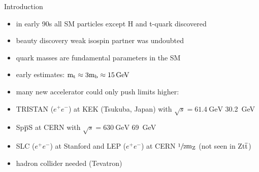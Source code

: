\begin{frame}{Introduction}

	\begin{minipage}[c][.23\textheight]{.8\textwidth}
		\begin{itemize}
			\itemfill
			\item in early 90s all SM particles except H and t-quark discovered
			\item beauty discovery \ra weak isospin partner was undoubted
			\item quark masses are fundamental parameters in the SM
		\end{itemize}
	\end{minipage}
	\begin{minipage}{.18\textwidth}
	\end{minipage}
	
	\begin{itemize}\itemfill
		\item early estimates: $\text{m}_{\text{t}} \approx 3 \text{m}_{\text{b}} \approx \SI{15}{\giga\electronvolt}$
		\item many new accelerator could only push limits higher:
		\item TRISTAN ($e^+e^-$) at KEK (Tsukuba, Japan) with $\sqrt{s} = \SI{61.4}{\giga\electronvolt}$ \ra \SI{30.2}{\giga\electronvolt}
		\item Sp$\overline{\text{p}}$S at CERN with $\sqrt{s} = \SI{630}{\giga\electronvolt}$ \ra \SI{69}{\giga\electronvolt}
		\item SLC ($e^+e^-$) at Stanford and LEP ($e^+e^-$) at CERN \ra $\sfrac{1}{2} \text{m}_{\text{Z}}$ (not seen in Z\ch{->}$\text{t}\overline{\text{t}}$)
		\item hadron collider needed (\ra Tevatron)
	\end{itemize}
	
\end{frame}
